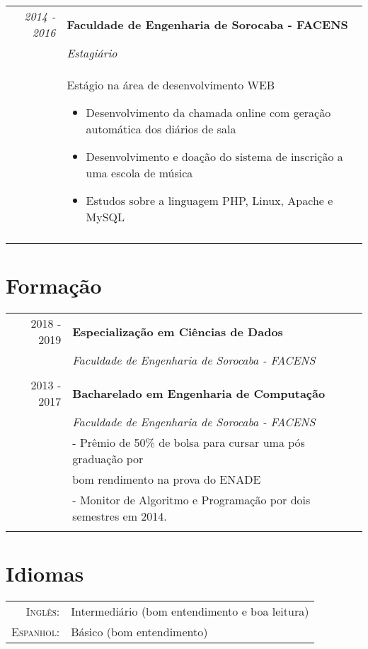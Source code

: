 \documentclass[a4paper,10pt]{article}
\begin{document}
\begin{tabular}{r|p{11cm}}
 \emph{2014 - 2016} & \textbf{Faculdade de Engenharia de Sorocaba - FACENS} \\
 & \emph{\textit{Estagiário}} \\
 & \footnotesize{Estágio na área de desenvolvimento WEB
  \begin{itemize}
 	\item Desenvolvimento da chamada online com geração automática dos diários de sala
 	\item Desenvolvimento e doação do sistema de inscrição a uma escola de música
 	\item Estudos sobre a linguagem PHP, Linux, Apache e MySQL
 \end{itemize}} \\ \multicolumn{2}{c}{} \\
\end{tabular}

\section{Formação}
\begin{tabular}{rl}	
 2018 - 2019 & \textbf{Especialização em Ciências de Dados} \\
& \textit{Faculdade de Engenharia de Sorocaba - FACENS} \\

\\

 2013 - 2017 & \textbf{Bacharelado em Engenharia de Computação} \\
& \textit{Faculdade de Engenharia de Sorocaba - FACENS} \\
& - Prêmio de 50\% de bolsa para cursar uma pós graduação por \\
&   bom rendimento na prova do ENADE \\
& - Monitor de Algoritmo e Programação por dois semestres em 2014.\\&\\

\end{tabular}

\section{Idiomas}
\begin{tabular}{rl}
\textsc{Inglês:}&Intermediário (bom entendimento e boa leitura)\\
\textsc{Espanhol:}&Básico (bom entendimento)\\
\end{tabular}
\end{document}
